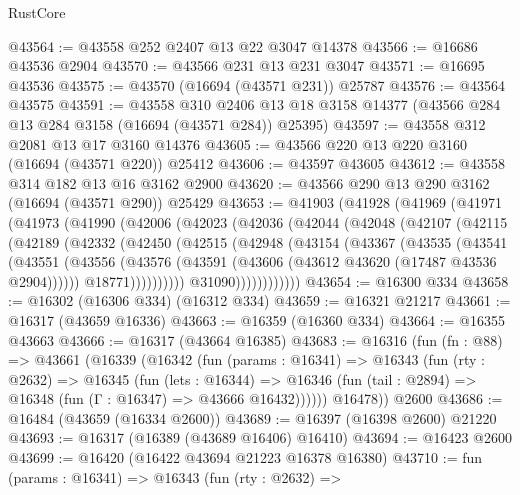 \begin{lexlean}{RustCore}
\begin{coremodule}
@43564 := @43558 @252 @2407 @13 @22 @3047 @14378
@43566 := @16686 @43536 @2904
@43570 := @43566 @231 @13 @231 @3047
@43571 := @16695 @43536
@43575 := @43570 (@16694 (@43571 @231)) @25787
@43576 := @43564 @43575
@43591 := @43558
    @310
    @2406
    @13
    @18
    @3158
    @14377
    (@43566 @284 @13 @284 @3158 (@16694 (@43571 @284)) @25395)
@43597 := @43558 @312 @2081 @13 @17 @3160 @14376
@43605 := @43566 @220 @13 @220 @3160 (@16694 (@43571 @220)) @25412
@43606 := @43597 @43605
@43612 := @43558 @314 @182 @13 @16 @3162 @2900
@43620 := @43566 @290 @13 @290 @3162 (@16694 (@43571 @290)) @25429
@43653 := @41903
    (@41928
      (@41969
        (@41971
          (@41973
            (@41990
              (@42006
                (@42023
                  (@42036
                    (@42044
                      (@42048
                        (@42107
                          (@42115
                            (@42189
                              (@42332
                                (@42450
                                  (@42515
                                    (@42948
                                      (@43154
                                        (@43367
                                          (@43535
                                            (@43541
                                              (@43551
                                                (@43556
                                                  (@43576
                                                    (@43591
                                                      (@43606
                                                        (@43612 @43620 (@17487 @43536 @2904))))))
                                                @18771))))))))))
                            @31090))))))))))))
@43654 := @16300 @334
@43658 := @16302 (@16306 @334) (@16312 @334)
@43659 := @16321 @21217
@43661 := @16317 (@43659 @16336)
@43663 := @16359 (@16360 @334)
@43664 := @16355 @43663
@43666 := @16317 (@43664 @16385)
@43683 := @16316
    (fun (fn : @88) =>
    @43661
      (@16339
        (@16342
          (fun (params : @16341) =>
          @16343
            (fun (rty : @2632) =>
            @16345
              (fun (lets : @16344) =>
              @16346 (fun (tail : @2894) => @16348 (fun (Γ : @16347) => @43666 @16432))))))
        @16478))
    @2600
@43686 := @16484 (@43659 (@16334 @2600))
@43689 := @16397 (@16398 @2600) @21220
@43693 := @16317 (@16389 (@43689 @16406) @16410)
@43694 := @16423 @2600
@43699 := @16420 (@16422 @43694 @21223 @16378 @16380)
@43710 := fun (params : @16341) =>
  @16343
    (fun (rty : @2632) =>

\end{coremodule}
\end{lexlean}
